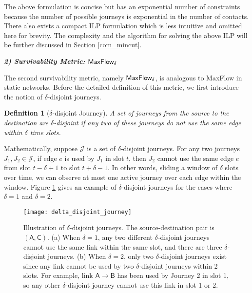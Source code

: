 \documentclass[10pt, conference, letterpaper]{IEEEtran}
\newtheorem{definition}{Definition}
\begin{document}
The above formulation is concise but has an exponential number of constraints because the number of possible journeys is exponential in the number of contacts. There also exists a compact ILP formulation which is less intuitive and omitted here for brevity. The complexity and the algorithm for solving the above ILP will be further discussed in Section \ref{com_mincut}.

\vspace{1mm}

\noindent \emph{\textbf{2) Survivability Metric: $\mathlarger{\mathsf{MaxFlow_{\delta}}}$}}

\vspace{1mm}

The second survivability metric, namely $\tt \mathsf{MaxFlow_{\delta}}$, is analogous to MaxFlow in static networks. Before the detailed definition of this metric, we first introduce the notion of $\delta$-disjoint journeys.

\begin{definition}[{$\delta$-disjoint Journey}]
A set of journeys from the source to the destination are $\delta$-disjoint if any two of these journeys do not use the same edge within $\delta$ time slots.
\end{definition}

\noindent Mathematically, suppose $\mathcal{J}$ is a set of $\delta$-disjoint journeys. For any two journeys $J_1,J_2\in \mathcal{J}$, if edge $e$ is used by $J_1$ in slot $t$, then $J_2$ cannot use the same edge $e$ from slot $t-\delta+1$ to slot $t+\delta-1$. In other words, sliding a window of $\delta$ slots over time, we can observe at most one active journey over each edge within the window. Figure \ref{disjoint_example} gives an example of $\delta$-disjoint journeys for the cases where $\delta=1$ and $\delta=2$. 

\begin{figure}[ht]
\begin{center}
\texttt{[image: delta\_disjoint\_journey]}
\caption{Illustration of $\delta$-disjoint journeys. The source-destination pair is $\mathsf{(A,C)}$. (a) When $\delta=1$, any two different $\delta$-disjoint journeys cannot use the same link within the same slot, and there are three $\delta$-disjoint journeys. (b) When $\delta=2$, only two $\delta$-disjoint journeys exist since any link cannot be used by two $\delta$-disjoint journeys within 2 slots. For example, link $\mathsf{A\rightarrow B}$ has been used by Journey 2 in slot 1, so any other $\delta$-disjoint journey cannot use this link in slot 1 or 2.}
\label{disjoint_example}\vspace{-3mm}
\end{center}
\end{figure}
\end{document}
